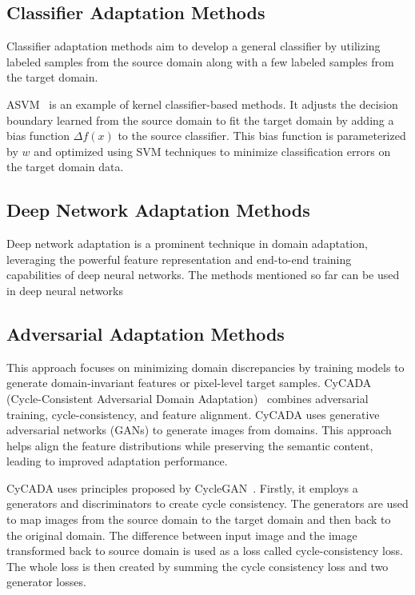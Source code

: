 \subsection{Classifier Adaptation Methods}
\label{Classifier}
Classifier adaptation methods aim to develop a general classifier by utilizing labeled samples from the source domain along with a few labeled samples from the target domain.

ASVM~\cite{asvm} is an example of kernel classifier-based methods. It adjusts the decision boundary learned from the source domain to fit the target domain by adding a bias function $\Delta f(x)$ to the source classifier. This bias function is parameterized by $w$ and optimized using SVM techniques to minimize classification errors on the target domain data. 
 
 \subsection{Deep Network Adaptation Methods}
Deep network adaptation is a prominent technique in domain adaptation, leveraging the powerful feature representation and end-to-end training capabilities of deep neural networks. The methods mentioned so far can be used in deep neural networks


\subsection{Adversarial Adaptation Methods}
This approach focuses on minimizing domain discrepancies by training models to generate domain-invariant features or pixel-level target samples. CyCADA (Cycle-Consistent Adversarial Domain Adaptation)~\cite{hybridMethod} combines adversarial training, cycle-consistency, and feature alignment. CyCADA uses generative adversarial networks (GANs) to generate images from domains. This approach helps align the feature distributions while preserving the semantic content, leading to improved adaptation performance.

CyCADA uses principles proposed by CycleGAN~\cite{CycleGAN}. Firstly, it employs a generators and discriminators to create cycle consistency. The generators are used to map images from the source domain to the target domain and then back to the original domain. The difference between input image and the image transformed back to source domain is used as a loss called cycle-consistency loss. The whole loss is then created by summing the cycle consistency loss and two generator losses.


